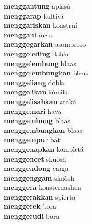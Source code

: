 \textbf{menggantung } aplasá \\
\textbf{menggarap } kultivá \\
\textbf{menggariskan } konstruí \\
\textbf{menggaul } meks \\
\textbf{menggegarkan } asombroso \\
\textbf{menggeleding } dobla \\
\textbf{menggelembung } blaas \\
\textbf{menggelembungkan } blaas \\
\textbf{menggeliang } dobla \\
\textbf{menggelikan } kómiko \\
\textbf{menggelisahkan } ataká \\
\textbf{menggemari } haya \\
\textbf{menggembung } blaas \\
\textbf{menggembungkan } blaas \\
\textbf{menggempur } bati \\
\textbf{menggenapkan } kompletá \\
\textbf{menggencet } skuòsh \\
\textbf{menggendong } carga \\
\textbf{menggenggam } skuòsh \\
\textbf{menggera } konsternashon \\
\textbf{menggerakkan } spierta \\
\textbf{menggerek } bora \\
\textbf{menggerudi } bora \\
